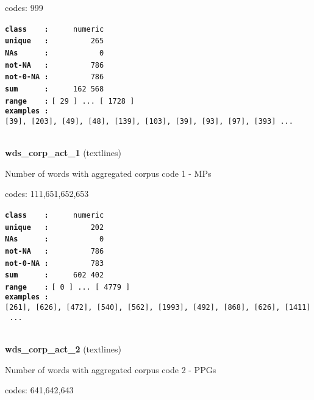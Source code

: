 \documentclass[]{article}
\begin{document}
codes: 999

\textbf{\texttt{class\ \ \ \ :}} \texttt{~~~~~numeric}\\
\textbf{\texttt{unique\ \ \ :}} \texttt{~~~~~~~~~265}\\
\textbf{\texttt{NAs\ \ \ \ \ \ :}} \texttt{~~~~~~~~~~~0}\\
\textbf{\texttt{not-NA\ \ \ :}} \texttt{~~~~~~~~~786}\\
\textbf{\texttt{not-0-NA\ :}} \texttt{~~~~~~~~~786}\\
\textbf{\texttt{sum\ \ \ \ \ \ :}} \texttt{~~~~~162~568}\\
\textbf{\texttt{range\ \ \ \ :}}
\texttt{{[}\ 29\ {]}\ ...\ {[}\ 1728\ {]}}\\
\textbf{\texttt{examples\ :}}
\texttt{{[}39{]},\ {[}203{]},\ {[}49{]},\ {[}48{]},\ {[}139{]},\ {[}103{]},\ {[}39{]},\ {[}93{]},\ {[}97{]},\ {[}393{]}\ ...}\\

~

\textbf{wds\_corp\_act\_1} (textlines)

Number of words with aggregated corpus code 1 - MPs

codes: 111,651,652,653

\textbf{\texttt{class\ \ \ \ :}} \texttt{~~~~~numeric}\\
\textbf{\texttt{unique\ \ \ :}} \texttt{~~~~~~~~~202}\\
\textbf{\texttt{NAs\ \ \ \ \ \ :}} \texttt{~~~~~~~~~~~0}\\
\textbf{\texttt{not-NA\ \ \ :}} \texttt{~~~~~~~~~786}\\
\textbf{\texttt{not-0-NA\ :}} \texttt{~~~~~~~~~783}\\
\textbf{\texttt{sum\ \ \ \ \ \ :}} \texttt{~~~~~602~402}\\
\textbf{\texttt{range\ \ \ \ :}}
\texttt{{[}\ 0\ {]}\ ...\ {[}\ 4779\ {]}}\\
\textbf{\texttt{examples\ :}}
\texttt{{[}261{]},\ {[}626{]},\ {[}472{]},\ {[}540{]},\ {[}562{]},\ {[}1993{]},\ {[}492{]},\ {[}868{]},\ {[}626{]},\ {[}1411{]}\ ...}\\

~

\textbf{wds\_corp\_act\_2} (textlines)

Number of words with aggregated corpus code 2 - PPGs

codes: 641,642,643
\end{document}
